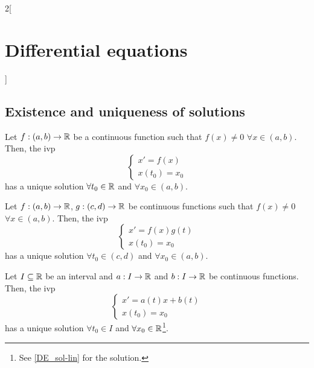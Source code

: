 \documentclass[../../../main_math.tex]{subfiles}
\begin{document}
\begin{multicols}{2}[\section{Differential equations}]
  \subsection{Existence and uniqueness of solutions}
  \begin{proposition}
    Let $f:(a,b)\rightarrow\mathbb{R}$ be a continuous function such that $f(x)\ne 0$ $\forall x\in(a,b)$. Then, the ivp
    $$
      \begin{cases}
        x'      =f(x) \\
        x(t_0)  =x_0
      \end{cases}
    $$
    has a unique solution $\forall t_0\in\mathbb{R}$ and $\forall x_0\in(a,b)$.
  \end{proposition}
  \begin{proposition}
    Let $f:(a,b)\rightarrow\mathbb{R}$, $g:(c,d)\rightarrow\mathbb{R}$ be continuous functions such that $f(x)\ne 0$ $\forall x\in(a,b)$. Then, the ivp
    $$\begin{cases}
        x'      =f(x)g(t) \\
        x(t_0)  =x_0
      \end{cases}$$
    has a unique solution $\forall t_0\in(c,d)$ and $\forall x_0\in(a,b)$.
  \end{proposition}
  \begin{proposition}
    Let $I\subseteq\mathbb{R}$ be an interval and $a:I\rightarrow\mathbb{R}$ and $b:I\rightarrow\mathbb{R}$ be continuous functions. Then, the ivp
    $$\begin{cases}
        x'      =a(t)x+b(t) \\
        x(t_0)  =x_0
      \end{cases}$$
    has a unique solution $\forall t_0\in I$ and $\forall x_0\in\mathbb{R}$\footnote{See \cref{DE_sol-lin} for the solution.}.
  \end{proposition}

\end{multicols}
\end{document}
